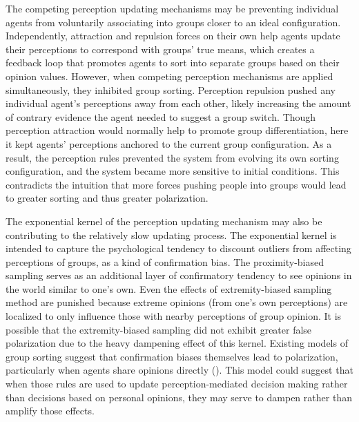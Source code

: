 The competing perception updating mechanisms may be preventing individual agents from voluntarily associating into groups closer to an ideal configuration. 
Independently, attraction and repulsion forces on their own help agents update their perceptions to correspond with groups' true means, which creates a feedback loop that promotes agents to sort into separate groups based on their opinion values. However, when competing perception mechanisms are applied simultaneously, they inhibited group sorting. Perception repulsion pushed any individual agent's perceptions away from each other, likely increasing the amount of contrary evidence the agent needed to suggest a group switch. Though perception attraction would normally help to promote group differentiation, here it kept agents' perceptions anchored to the current group configuration. As a result, the perception rules prevented the system from evolving its own sorting configuration, and the system became more sensitive to initial conditions. This contradicts the intuition that more forces pushing people into groups would lead to greater sorting and thus greater polarization. 

The exponential kernel of the perception updating mechanism may also be contributing to the relatively slow updating process. 
The exponential kernel is intended to capture the psychological tendency to discount outliers from affecting perceptions of groups, as a kind of confirmation bias. The proximity-biased sampling serves as an additional layer of confirmatory tendency to see opinions in the world similar to one's own. 
Even the effects of extremity-biased sampling method are punished because extreme opinions (from one's own perceptions) are localized to only influence those with nearby perceptions of group opinion. 
It is possible that the extremity-biased sampling did not exhibit greater false polarization due to the heavy dampening effect of this kernel. 
Existing models of group sorting suggest that confirmation biases themselves lead to polarization, particularly when agents share opinions directly (\cite{hegselmann_opinion_2005}). 
This model could suggest that when those rules are used to update perception-mediated decision making rather than decisions based on personal opinions, they may serve to dampen rather than amplify those effects. 


